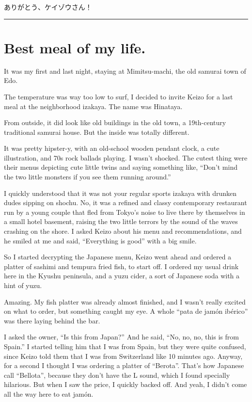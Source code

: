 \documentclass[
  letterpaper,
  oneside]{scrbook}
\begin{document}
ありがとう、ケイゾウさん！

\begin{center}\rule{0.5\linewidth}{0.5pt}\end{center}


\chapter{Best meal of my life.}\label{best-meal-of-my-life.}

It was my first and last night, staying at Mimitsu-machi, the old
samurai town of Edo.

The temperature was way too low to surf, I decided to invite Keizo for a
last meal at the neighborhood izakaya. The name was Hinataya.

From outside, it did look like old buildings in the old town, a
19th-century traditional samurai house. But the inside was totally
different.

It was pretty hipster-y, with an old-school wooden pendant clock, a cute
illustration, and 70s rock ballads playing. I wasn't shocked. The cutest
thing were their menus depicting cute little twins and saying something
like, ``Don't mind the two little monsters if you see them running
around.''

I quickly understood that it was not your regular sports izakaya with
drunken dudes sipping on shochu. No, it was a refined and classy
contemporary restaurant run by a young couple that fled from Tokyo's
noise to live there by themselves in a small hotel basement, raising the
two little terrors by the sound of the waves crashing on the shore. I
asked Keizo about his menu and recommendations, and he smiled at me and
said, ``Everything is good'' with a big smile.

So I started decrypting the Japanese menu, Keizo went ahead and ordered
a platter of sashimi and tempura fried fish, to start off. I ordered my
usual drink here in the Kyushu peninsula, and a yuzu cider, a sort of
Japanese soda with a hint of yuzu.

Amazing. My fish platter was already almost finished, and I wasn't
really excited on what to order, but something caught my eye. A whole
``pata de jamón ibérico'' was there laying behind the bar.

I asked the owner, ``Is this from Japan?'' And he said, ``No, no, no,
this is from Spain.'' I started telling him that I was from Spain, but
they were quite confused, since Keizo told them that I was from
Switzerland like 10 minutes ago. Anyway, for a second I thought I was
ordering a platter of ``Berota''. That's how Japanese call ``Bellota'',
because they don't have the L sound, which I found specially hilarious.
But when I saw the price, I quickly backed off. And yeah, I didn't come
all the way here to eat jamón.
\end{document}
